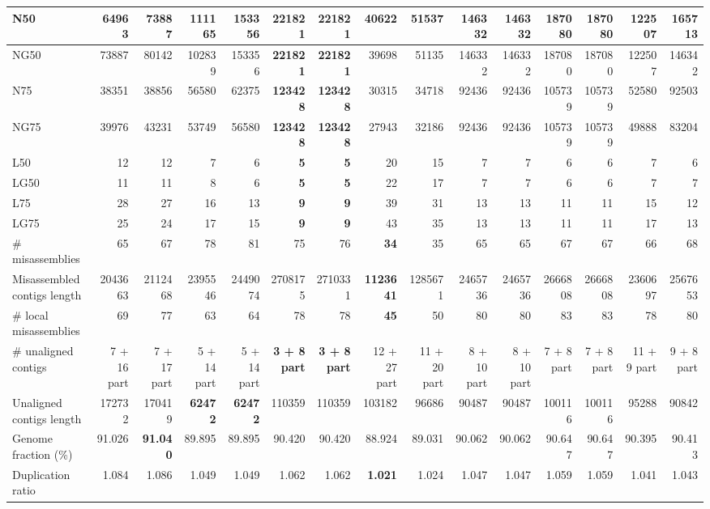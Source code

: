 \documentclass[12pt,a4paper]{article}
\begin{document}
\begin{table}[ht]
\begin{center}
\begin{tabular}{|l*{14}{|r}|}
N50 & 64963 & 73887 & 111165 & 153356 & {\bf 221821} & {\bf 221821} & 40622 & 51537 & 146332 & 146332 & 187080 & 187080 & 122507 & 165713 \\ \hline
NG50 & 73887 & 80142 & 102839 & 153356 & {\bf 221821} & {\bf 221821} & 39698 & 51135 & 146332 & 146332 & 187080 & 187080 & 122507 & 146342 \\ \hline
N75 & 38351 & 38856 & 56580 & 62375 & {\bf 123428} & {\bf 123428} & 30315 & 34718 & 92436 & 92436 & 105739 & 105739 & 52580 & 92503 \\ \hline
NG75 & 39976 & 43231 & 53749 & 56580 & {\bf 123428} & {\bf 123428} & 27943 & 32186 & 92436 & 92436 & 105739 & 105739 & 49888 & 83204 \\ \hline
L50 & 12 & 12 & 7 & 6 & {\bf 5} & {\bf 5} & 20 & 15 & 7 & 7 & 6 & 6 & 7 & 6 \\ \hline
LG50 & 11 & 11 & 8 & 6 & {\bf 5} & {\bf 5} & 22 & 17 & 7 & 7 & 6 & 6 & 7 & 7 \\ \hline
L75 & 28 & 27 & 16 & 13 & {\bf 9} & {\bf 9} & 39 & 31 & 13 & 13 & 11 & 11 & 15 & 12 \\ \hline
LG75 & 25 & 24 & 17 & 15 & {\bf 9} & {\bf 9} & 43 & 35 & 13 & 13 & 11 & 11 & 17 & 13 \\ \hline
\# misassemblies & 65 & 67 & 78 & 81 & 75 & 76 & {\bf 34} & 35 & 65 & 65 & 67 & 67 & 66 & 68 \\ \hline
Misassembled contigs length & 2043663 & 2112468 & 2395546 & 2449074 & 2708175 & 2710331 & {\bf 1123641} & 1285671 & 2465736 & 2465736 & 2666808 & 2666808 & 2360697 & 2567653 \\ \hline
\# local misassemblies & 69 & 77 & 63 & 64 & 78 & 78 & {\bf 45} & 50 & 80 & 80 & 83 & 83 & 78 & 80 \\ \hline
\# unaligned contigs & 7 + 16 part & 7 + 17 part & 5 + 14 part & 5 + 14 part & {\bf 3 + 8 part} & {\bf 3 + 8 part} & 12 + 27 part & 11 + 20 part & 8 + 10 part & 8 + 10 part & 7 + 8 part & 7 + 8 part & 11 + 9 part & 9 + 8 part \\ \hline
Unaligned contigs length & 172732 & 170419 & {\bf 62472} & {\bf 62472} & 110359 & 110359 & 103182 & 96686 & 90487 & 90487 & 100116 & 100116 & 95288 & 90842 \\ \hline
Genome fraction (\%) & 91.026 & {\bf 91.040} & 89.895 & 89.895 & 90.420 & 90.420 & 88.924 & 89.031 & 90.062 & 90.062 & 90.647 & 90.647 & 90.395 & 90.413 \\ \hline
Duplication ratio & 1.084 & 1.086 & 1.049 & 1.049 & 1.062 & 1.062 & {\bf 1.021} & 1.024 & 1.047 & 1.047 & 1.059 & 1.059 & 1.041 & 1.043 \\ \hline

\end{tabular}
\end{center}
\end{table}
\end{document}
